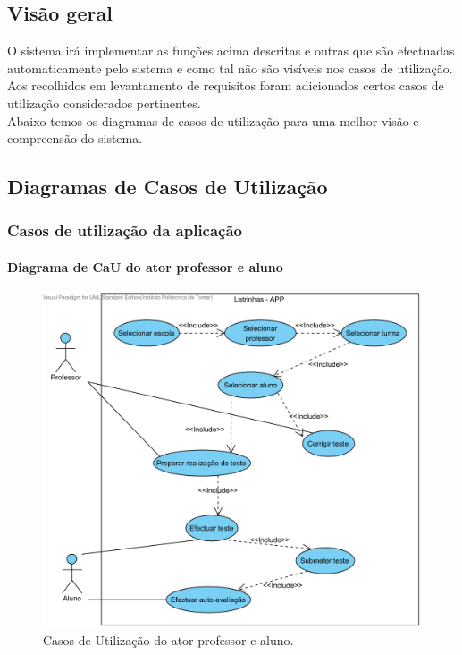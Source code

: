 \documentclass[a4paper]{article}
\begin{document}
	
			
			
			\subsection{Visão geral}
		O sistema irá implementar as funções acima descritas e outras que são efectuadas automaticamente pelo sistema e como tal não são visíveis nos casos de utilização.\\
		
		Aos recolhidos em levantamento de requisitos foram adicionados certos casos de utilização considerados pertinentes.\\
		
		Abaixo temos os diagramas de casos de utilização para uma melhor  visão e compreensão do sistema.

			
			\newpage
			
			\subsection{Diagramas de Casos de Utilização}
			\subsubsection{Casos de utilização da aplicação}
			
			\paragraph{Diagrama de CaU do ator professor e aluno}
			
			\begin{figure}[h]
				\centering
				\includegraphics[width=0.8\linewidth]{./diagramasAnaliseSistemas/APP}
				\caption{Casos de Utilização do ator professor e aluno.}
				\label{fig:APP}
			\end{figure}
\end{document}
